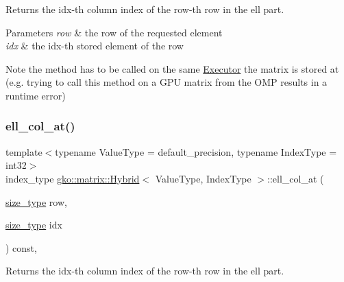 Returns the {\ttfamily idx}-\/th column index of the {\ttfamily row}-\/th row in the ell part. 


\begin{DoxyParams}{Parameters}
{\em row} & the row of the requested element \\
\hline
{\em idx} & the idx-\/th stored element of the row\\
\hline
\end{DoxyParams}
\begin{DoxyNote}{Note}
the method has to be called on the same \hyperlink{classgko_1_1Executor}{Executor} the matrix is stored at (e.\+g. trying to call this method on a G\+PU matrix from the O\+MP results in a runtime error) 
\end{DoxyNote}
\mbox{\label{classgko_1_1matrix_1_1Hybrid_a3a2d9b00dd8b2333b05a97d968dfabff}} 
\subsubsection{\texorpdfstring{ell\+\_\+col\+\_\+at()}{ell\_col\_at()}\hspace{0.1cm}{\footnotesize\ttfamily [2/2]}}
{\footnotesize\ttfamily template$<$typename Value\+Type = default\+\_\+precision, typename Index\+Type = int32$>$ \\
index\+\_\+type \hyperlink{classgko_1_1matrix_1_1Hybrid}{gko\+::matrix\+::\+Hybrid}$<$ Value\+Type, Index\+Type $>$\+::ell\+\_\+col\+\_\+at (\begin{DoxyParamCaption}\item[{\hyperlink{namespacegko_a6e5c95df0ae4e47aab2f604a22d98ee7}{size\+\_\+type}}]{row,  }\item[{\hyperlink{namespacegko_a6e5c95df0ae4e47aab2f604a22d98ee7}{size\+\_\+type}}]{idx }\end{DoxyParamCaption}) const\hspace{0.3cm}{\ttfamily [inline]}, {\ttfamily [noexcept]}}



Returns the {\ttfamily idx}-\/th column index of the {\ttfamily row}-\/th row in the ell part. 


